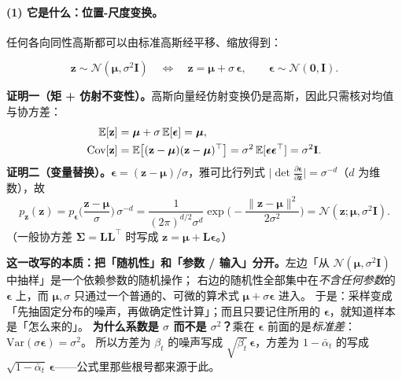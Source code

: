 \documentclass[a4paper,fontset=none,zihao=5]{ctexart}
\numberwithin{equation}{section}
\newcommand{\I}{\mathbf{I}}
\newcommand{\N}{\mathcal{N}}
\newcommand{\abar}{\bar{\alpha}}
\newcommand{\eps}{\boldsymbol{\epsilon}}
\newcommand{\E}{\mathbb{E}}
\begin{document}
\paragraph{(1) 它是什么：位置-尺度变换。}任何各向同性高斯都可以由标准高斯经平移、缩放得到：
\begin{keybox}
\begin{equation}
  \mathbf{z}\sim\N(\boldsymbol{\mu},\sigma^2\I)
  \quad\Longleftrightarrow\quad
  \mathbf{z}=\boldsymbol{\mu}+\sigma\,\eps,\qquad \eps\sim\N(\mathbf{0},\I).
  \label{eq:reparam}
\end{equation}
\end{keybox}
\textbf{证明一（矩 + 仿射不变性）。}高斯向量经仿射变换仍是高斯，因此只需核对均值与协方差：
\begin{align}
  \E[\mathbf{z}] &= \boldsymbol{\mu}+\sigma\,\E[\eps]=\boldsymbol{\mu}, \notag\\
  \mathrm{Cov}[\mathbf{z}] &= \E\big[(\mathbf{z}-\boldsymbol{\mu})(\mathbf{z}-\boldsymbol{\mu})^\top\big]
   =\sigma^2\,\E[\eps\eps^\top]=\sigma^2\I. \notag
\end{align}
\textbf{证明二（变量替换）。}$\eps=(\mathbf{z}-\boldsymbol{\mu})/\sigma$，雅可比行列式 $\big|\det\frac{\partial\eps}{\partial\mathbf{z}}\big|=\sigma^{-d}$（$d$ 为维数），故
\begin{equation}
  p_{\mathbf{z}}(\mathbf{z})=p_{\eps}\Big(\frac{\mathbf{z}-\boldsymbol{\mu}}{\sigma}\Big)\,\sigma^{-d}
  =\frac{1}{(2\pi)^{d/2}\sigma^{d}}\exp\!\Big(-\frac{\|\mathbf{z}-\boldsymbol{\mu}\|^2}{2\sigma^2}\Big)=\N(\mathbf{z};\boldsymbol{\mu},\sigma^2\I).
\end{equation}
（一般协方差 $\boldsymbol{\Sigma}=\mathbf{L}\mathbf{L}^\top$ 时写成 $\mathbf{z}=\boldsymbol{\mu}+\mathbf{L}\eps$。）

\begin{whybox}
\textbf{这一改写的本质：把「随机性」和「参数 / 输入」分开。}左边「从 $\N(\boldsymbol{\mu},\sigma^2\I)$ 中抽样」是一个依赖参数的随机操作；
右边的随机性全部集中在\emph{不含任何参数}的 $\eps$ 上，而 $\boldsymbol{\mu},\sigma$ 只通过一个普通的、可微的算术式 $\boldsymbol{\mu}+\sigma\eps$ 进入。
于是：采样变成「先抽固定分布的噪声，再做确定性计算」；而且只要记住所用的 $\eps$，就知道样本是「怎么来的」。
\textbf{为什么系数是 $\sigma$ 而不是 $\sigma^2$？}乘在 $\eps$ 前面的是\emph{标准差}：$\mathrm{Var}(\sigma\eps)=\sigma^2$。
所以方差为 $\beta_t$ 的噪声写成 $\sqrt{\beta_t}\,\eps$，方差为 $1-\abar_t$ 的写成 $\sqrt{1-\abar_t}\,\eps$——公式里那些根号都来源于此。
\end{whybox}
\end{document}
